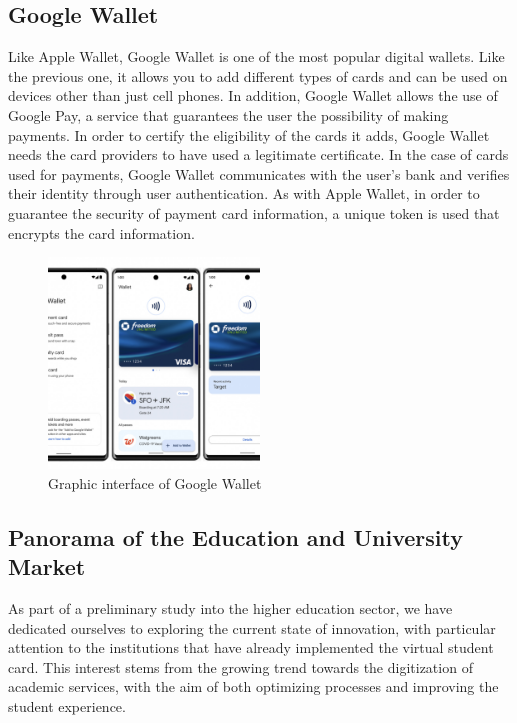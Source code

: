 \documentclass[10pt]{article}
\begin{document}
\subsection{Google Wallet}
Like Apple Wallet, Google Wallet is one of the most popular digital wallets. Like the previous one, it allows you to add different types of cards and can be used on devices other than just cell phones. In addition, Google Wallet allows the use of Google Pay, a service that guarantees the user the possibility of making payments.
In order to certify the eligibility of the cards it adds, Google Wallet needs the card providers to have used a legitimate certificate. In the case of cards used for payments, Google Wallet communicates with the user's bank and verifies their identity through user authentication. As with Apple Wallet, in order to guarantee the security of payment card information, a unique token is used that encrypts the card information.

\begin{figure}[H]
    \centering
    \includegraphics[width=0.5\textwidth]{report-images/google-wallet.png}
    \caption{Graphic interface of Google Wallet}
    \label{fig:fig-2}
\end{figure}

\subsection{Panorama of the Education and University Market}
As part of a preliminary study into the higher education sector, we have dedicated ourselves to exploring the current state of innovation, with particular attention to the institutions
that have already implemented the virtual student card. This interest stems from the
growing trend towards the digitization of academic services, with the aim of both
optimizing processes and improving the student experience.
\end{document}
